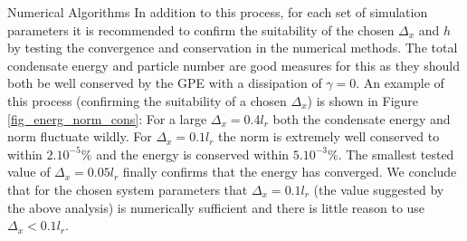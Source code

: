 \begin{chapter}{\label{cha:numerics}Numerical Algorithms}
  In addition to this process, for each set of simulation parameters it is recommended to confirm the suitability of the chosen $\Delta_x$ and $h$ by testing the convergence and conservation in the numerical methods. The total condensate energy and particle number are good measures for this as they should both be well conserved by the GPE with a dissipation of $\gamma=0$. An example of this process (confirming the suitability of a chosen $\Delta_x$) is shown in Figure \ref{fig_energ_norm_cons}: For a large $\Delta_x=0.4l_r$ both the condensate energy and norm fluctuate wildly. For $\Delta_x=0.1l_r$ the norm is extremely well conserved to within $2.10^{-5}\%$ and the energy is conserved within $5.10^{-3}\%$. The smallest tested value of $\Delta_x=0.05l_r$ finally confirms that the energy has converged. We conclude that for the chosen system parameters that $\Delta_x=0.1l_r$ (the value suggested by the above analysis) is numerically sufficient and there is little reason to use $\Delta_x<0.1l_r$.


\end{chapter}
